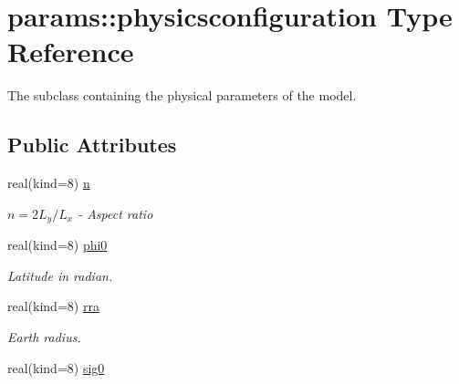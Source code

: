 \hypertarget{structparams_1_1physicsconfiguration}{}\section{params\+:\+:physicsconfiguration Type Reference}
\label{structparams_1_1physicsconfiguration}


The subclass containing the physical parameters of the model.  


\subsection*{Public Attributes}
\begin{DoxyCompactItemize}
\item 
\mbox{\label{structparams_1_1physicsconfiguration_abc99c6428c59f5d8fc95140bbcba4456}} 
real(kind=8) \hyperlink{structparams_1_1physicsconfiguration_abc99c6428c59f5d8fc95140bbcba4456}{n}
\begin{DoxyCompactList}\small\item\em $n = 2 L_y / L_x$ -\/ Aspect ratio \end{DoxyCompactList}\item 
\mbox{\label{structparams_1_1physicsconfiguration_a840e968e2974fee05717f9e16ec9a2ae}} 
real(kind=8) \hyperlink{structparams_1_1physicsconfiguration_a840e968e2974fee05717f9e16ec9a2ae}{phi0}
\begin{DoxyCompactList}\small\item\em Latitude in radian. \end{DoxyCompactList}\item 
\mbox{\label{structparams_1_1physicsconfiguration_a936fd2fac6866cc442d523678f23adc2}} 
real(kind=8) \hyperlink{structparams_1_1physicsconfiguration_a936fd2fac6866cc442d523678f23adc2}{rra}
\begin{DoxyCompactList}\small\item\em Earth radius. \end{DoxyCompactList}\item 
\mbox{\label{structparams_1_1physicsconfiguration_a2d5c630cd39658adde8d9e657105e5ef}} 
real(kind=8) \hyperlink{structparams_1_1physicsconfiguration_a2d5c630cd39658adde8d9e657105e5ef}{sig0}

\end{DoxyCompactItemize}
